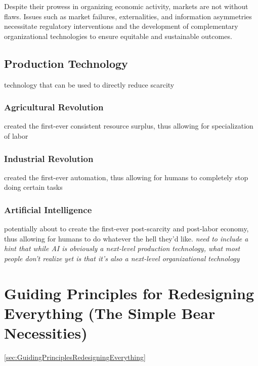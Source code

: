 \documentclass{article}
\begin{document}
Despite their prowess in organizing economic activity, markets are not without flaws. Issues such as market failures, externalities, and information asymmetries necessitate regulatory interventions and the development of complementary organizational technologies to ensure equitable and sustainable outcomes.

\subsection{Production Technology}
\label{sec:ProductionTechnology}

technology that can be used to directly reduce scarcity

\subsubsection{Agricultural Revolution}
\label{sec:AgriculturalRevolution}

created the first-ever consistent resource surplus, thus allowing for specialization of labor

\subsubsection{Industrial Revolution}
\label{sec:IndustrialRevolution}

created the first-ever automation, thus allowing for humans to completely stop doing certain tasks

\subsubsection{Artificial Intelligence}
\label{sec:ArtificialIntelligence}

potentially about to create the first-ever post-scarcity and post-labor economy, thus allowing for humans to do whatever the hell they'd like.
\textit{need to include a hint that while AI is obviously a next-level production technology, what most people don't realize yet is that it's also a next-level organizational technology}







\section{Guiding Principles for Redesigning Everything (The Simple Bear Necessities)}
\ref{sec:GuidingPrinciplesRedesigningEverything}
\end{document}
